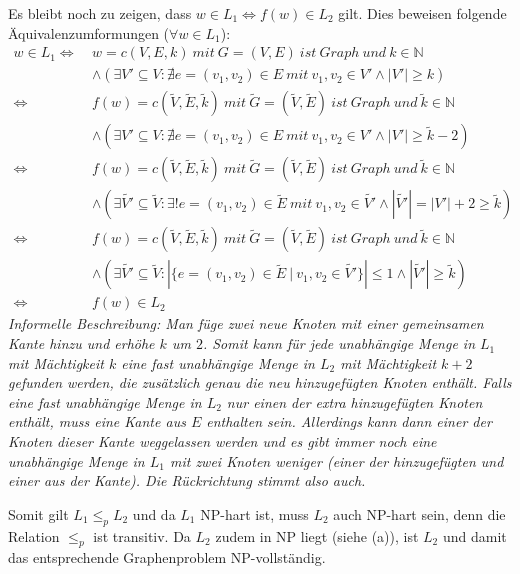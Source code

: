 \begin{teile}
	Es bleibt noch zu zeigen, dass $w \in L_1 \Leftrightarrow f(w) \in L_2$ gilt. Dies beweisen folgende Äquivalenzumformungen ($\forall w \in L_1$):
	\begin{align*}
		w \in L_1 \Leftrightarrow\ & w=c(V,E,k)\ mit\ G=(V,E)\ ist\ Graph\ und\ k \in \mathbb{N}\\
		& \wedge (\exists V'\subseteq V:\nexists e=(v_1,v_2)\in E\ mit\ v_1,v_2 \in V' \wedge |V'|\geq k)\\
		\Leftrightarrow\ &f(w)=c(\tilde{V},\tilde{E},\tilde{k})\ mit\ \tilde{G}=(\tilde{V},\tilde{E})\ ist\ Graph\ und\ \tilde{k} \in \mathbb{N}\\
		& \wedge (\exists V'\subseteq V:\nexists e=(v_1,v_2)\in E\ mit\ v_1,v_2 \in V' \wedge |V'|\geq \tilde{k}-2)\\
		\Leftrightarrow\ &f(w)=c(\tilde{V},\tilde{E},\tilde{k})\ mit\ \tilde{G}=(\tilde{V},\tilde{E})\ ist\ Graph\ und\ \tilde{k} \in \mathbb{N}\\
		& \wedge (\exists \tilde{V'}\subseteq \tilde{V}:\exists! e=(v_1,v_2)\in \tilde{E}\ mit\ v_1,v_2 \in \tilde{V'} \wedge |\tilde{V'}|=|V'|+2\geq \tilde{k})\\
		\Leftrightarrow\ &f(w)=c(\tilde{V},\tilde{E},\tilde{k})\ mit\ \tilde{G}=(\tilde{V},\tilde{E})\ ist\ Graph\ und\ \tilde{k} \in \mathbb{N}\\
		& \wedge (\exists \tilde{V'}\subseteq \tilde{V}: |\{e=(v_1,v_2)\in \tilde{E}\ \vert\ v_1,v_2 \in \tilde{V'}\}|\leq 1 \wedge |\tilde{V'}|\geq \tilde{k})\\
		\Leftrightarrow\ &f(w) \in L_2
	\end{align*}
	\textit{Informelle Beschreibung: Man füge zwei neue Knoten mit einer gemeinsamen Kante hinzu und erhöhe $k$ um $2$. Somit kann für jede unabhängige Menge in $L_1$ mit Mächtigkeit $k$ eine fast unabhängige Menge in $L_2$ mit Mächtigkeit $k+2$ gefunden werden, die zusätzlich genau die neu hinzugefügten Knoten enthält. Falls eine fast unabhängige Menge in $L_2$ nur einen der extra hinzugefügten Knoten enthält, muss eine Kante aus $E$ enthalten sein. Allerdings kann dann einer der Knoten dieser Kante weggelassen werden und es gibt immer noch eine unabhängige Menge in $L_1$ mit zwei Knoten weniger (einer der hinzugefügten und einer aus der Kante). Die Rückrichtung stimmt also auch.}

	Somit gilt $L_1 \leq_p L_2$ und da $L_1$ NP-hart ist, muss $L_2$ auch NP-hart sein, denn die Relation $\leq_p$ ist transitiv. Da $L_2$ zudem in NP liegt (siehe (a)), ist $L_2$ und damit das entsprechende Graphenproblem NP-vollständig.
	
\end{teile}


